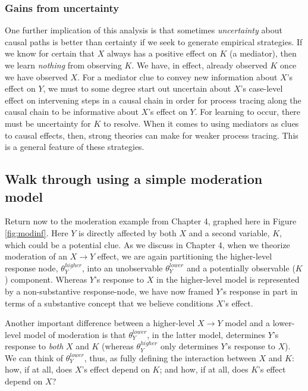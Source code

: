 \documentclass[12pt,]{book}
\begin{document}
\hypertarget{gains-from-uncertainty}{%
\subsubsection{Gains from uncertainty}\label{gains-from-uncertainty}}

One further implication of this analysis is that sometimes \emph{uncertainty} about causal paths is better than certainty if we seek to generate empirical strategies. If we know for certain that \(X\) always has a positive effect on \(K\) (a mediator), then we learn \emph{nothing} from observing \(K\). We have, in effect, already observed \(K\) once we have observed \(X\). For a mediator clue to convey new information about \(X\)'s effect on \(Y\), we must to some degree start out uncertain about \(X\)'s case-level effect on intervening steps in a causal chain in order for process tracing along the causal chain to be informative about \(X\)'s effect on \(Y\). For learning to occur, there must be uncertainty for \(K\) to resolve. When it comes to using mediators as clues to causal effects, then, strong theories can make for weaker process tracing. This is a general feature of these strategies.

\hypertarget{walk-through-using-a-simple-moderation-model}{%
\subsection{Walk through using a simple moderation model}\label{walk-through-using-a-simple-moderation-model}}

Return now to the moderation example from Chapter 4, graphed here in Figure \ref{fig:modinf}. Here \(Y\) is directly affected by both \(X\) and a second variable, \(K\), which could be a potential clue. As we discuss in Chapter 4, when we theorize moderation of an \(X \rightarrow Y\) effect, we are again partitioning the higher-level response node, \(\theta_Y^{higher}\), into an unobservable \(\theta_Y^{lower}\) and a potentially observable (\(K\)) component. Whereas \(Y\)'s response to \(X\) in the higher-level model is represented by a non-substantive response-node, we have now framed \(Y\)'s response in part in terms of a substantive concept that we believe conditions \(X\)'s effect.

Another important difference between a higher-level \(X \rightarrow Y\) model and a lower-level model of moderation is that \(\theta_Y^{lower}\), in the latter model, determines \(Y\)'s response to \emph{both} \(X\) and \(K\) (whereas \(\theta_Y^{higher}\) only determines \(Y\)'s response to \(X\)). We can think of \(\theta_Y^{lower}\), thus, as fully defining the interaction between \(X\) and \(K\): how, if at all, does \(X\)'s effect depend on \(K\); and how, if at all, does \(K\)'s effect depend on \(X\)?
\end{document}
